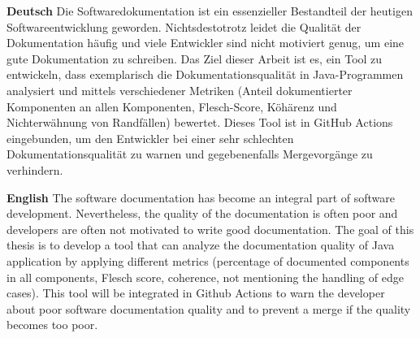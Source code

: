 \textbf{Deutsch}
Die Softwaredokumentation ist ein essenzieller Bestandteil der heutigen Softwareentwicklung geworden. Nichtsdestotrotz leidet die Qualität der Dokumentation häufig und viele Entwickler sind nicht motiviert genug, um eine gute Dokumentation zu schreiben. Das Ziel dieser Arbeit ist es, ein Tool zu entwickeln, dass exemplarisch die Dokumentationsqualität in Java-Programmen analysiert und mittels verschiedener Metriken (Anteil dokumentierter Komponenten an allen Komponenten, Flesch-Score, Köhärenz und Nichterwähnung von Randfällen) bewertet. Dieses Tool ist in GitHub Actions eingebunden, um den Entwickler bei einer sehr schlechten Dokumentationsqualität zu warnen und gegebenenfalls Mergevorgänge zu verhindern.

\bigskip

\noindent
\textbf{English} 
The software documentation has become an integral part of software development. Nevertheless, the quality of the documentation is often poor and developers are often not motivated to write good documentation. The goal of this thesis is to develop a tool that can analyze the documentation quality of Java application by applying different metrics (percentage of documented components in all components, Flesch score, coherence, not mentioning the handling of edge cases). This tool will be integrated in Github Actions to warn the developer about poor software documentation quality and to prevent a merge if the quality becomes too poor.  

